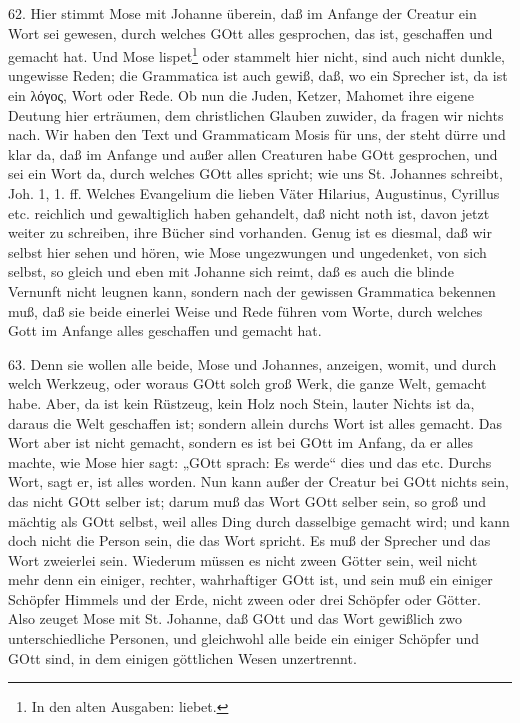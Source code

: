 62. Hier stimmt Mose mit Johanne überein, daß im Anfange der Creatur ein Wort sei gewesen, durch welches GOtt alles gesprochen, das ist, geschaffen und gemacht hat. Und Mose lispet\footnote{In den alten Ausgaben: liebet.} oder stammelt hier nicht, sind auch nicht dunkle, ungewisse Reden; die Grammatica ist auch gewiß, daß, wo ein Sprecher ist, da ist ein λόγος, Wort oder Rede. Ob nun die Juden, Ketzer, Mahomet ihre eigene Deutung hier erträumen, dem christlichen Glauben zuwider, da fragen wir nichts nach. Wir haben den Text und Grammaticam Mosis für uns, der steht dürre und klar da, daß im Anfange und außer allen Creaturen habe GOtt gesprochen, und sei ein Wort da, durch welches GOtt alles spricht; wie uns St. Johannes schreibt, Joh. 1, 1. ff. Welches Evangelium die lieben Väter Hilarius, Augustinus, Cyrillus etc. reichlich und gewaltiglich haben gehandelt, daß nicht noth ist, davon jetzt weiter zu schreiben, ihre Bücher sind vorhanden. Genug ist es diesmal, daß wir selbst hier sehen und hören, wie Mose ungezwungen und ungedenket, von sich selbst, so gleich und eben mit Johanne sich reimt, daß es auch die blinde Vernunft nicht leugnen kann, sondern nach der gewissen Grammatica bekennen muß, daß sie beide einerlei Weise und Rede führen vom Worte, durch welches Gott im Anfange alles geschaffen und gemacht hat.

63. Denn sie wollen alle beide, Mose und Johannes, anzeigen, womit, und durch welch Werkzeug, oder woraus GOtt solch groß Werk, die ganze Welt, gemacht habe. Aber, da ist kein Rüstzeug, kein Holz noch Stein, lauter Nichts ist da, daraus die Welt geschaffen ist; sondern allein durchs Wort ist alles gemacht. Das Wort aber ist nicht gemacht, sondern es ist bei GOtt im Anfang, da er alles machte, wie Mose hier sagt: „GOtt sprach: Es werde“ dies und das etc. Durchs Wort, sagt er, ist alles worden. Nun kann außer der Creatur bei GOtt nichts sein, das nicht GOtt selber ist; darum muß das Wort GOtt selber sein, so groß und mächtig als GOtt selbst, weil alles Ding durch dasselbige gemacht wird; und kann doch nicht die Person sein, die das Wort spricht. Es muß der Sprecher und das Wort zweierlei sein. Wiederum müssen es nicht zween Götter sein, weil nicht mehr denn ein einiger, rechter, wahrhaftiger GOtt ist, und sein muß ein einiger Schöpfer Himmels und der Erde, nicht zween oder drei Schöpfer oder Götter. Also zeuget Mose mit St. Johanne, daß GOtt und das Wort gewißlich zwo unterschiedliche Personen, und gleichwohl alle beide ein einiger Schöpfer und GOtt sind, in dem einigen göttlichen Wesen unzertrennt.

